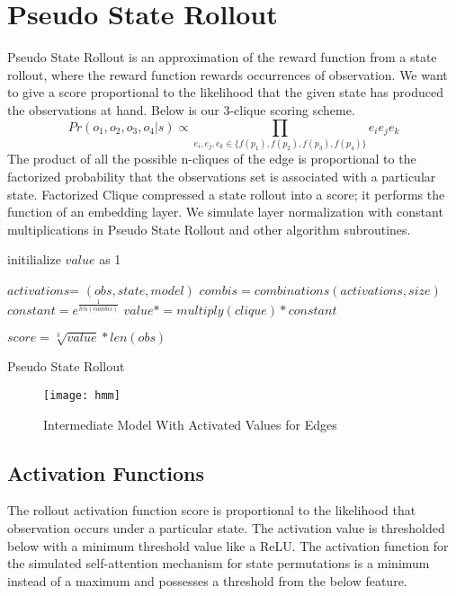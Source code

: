 \documentclass[10pt, conference, compsocconf]{IEEEtran}
\begin{document}
\section{Pseudo State Rollout}
{\sc Pseudo State Rollout } is an approximation of the reward function from a state rollout, where the reward function rewards occurrences of observation.
We want to give a score proportional to the likelihood that the given state has produced the observations at hand. Below is our 3-clique scoring scheme.
\begin{equation}
    Pr(o_1, o_2, o_3, o_4|s) \propto \prod_{e_i, e_j, e_k \in \{f(p_1), f(p_2), f(p_3), f(p_4)\}} e_ie_je_k
\end{equation}
The product of all the possible n-cliques of the edge is proportional to the factorized probability that the observations set is associated with a particular state. {\sc Factorized Clique} compressed a state rollout into a score; it performs the function of an embedding layer. We simulate layer normalization with constant multiplications in Pseudo State Rollout and other algorithm subroutines.

\begin{algorithm}[h]
initilialize $value$ as 1 \;
{
    $activations$= $(obs, state, model)$\;
    $combis = combinations(activations, size)$ \;
    $constant = e^{\frac{1}{len(combis)}}$ \;
    {
        $value *= multiply(clique) * constant $\;
    }
    
}
$score = \sqrt[3]{value}* len(obs)$ \;
\caption{{\sc Pseudo State Rollout}}
\end{algorithm}

\begin{figure}
    \centering
    \texttt{[image: hmm]}
    \caption{Intermediate Model With Activated Values for Edges}
    \label{fig:my_label}
\end{figure}

\subsection{Activation Functions}
The rollout activation function score is proportional to the likelihood that observation occurs under a particular state. The activation value is thresholded below with a minimum threshold value like a ReLU. The activation function for the simulated self-attention mechanism for state permutations is a minimum instead of a maximum and possesses a threshold from the below feature.
\end{document}
